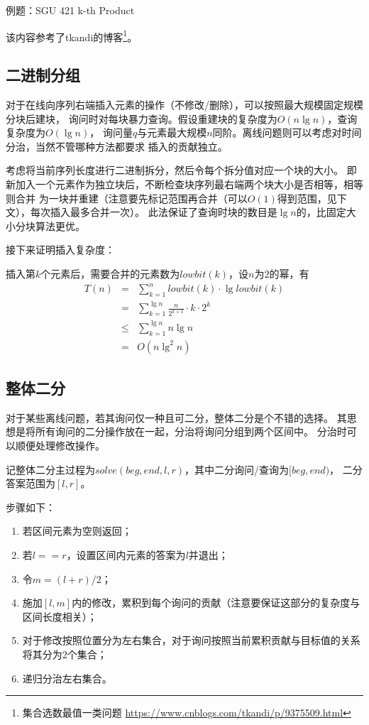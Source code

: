 例题：SGU 421 k-th Product

该内容参考了tkandi的博客\footnote{
	集合选数最值一类问题
	\url{https://www.cnblogs.com/tkandi/p/9375509.html}
}。
\subsection{二进制分组}\label{BinIns}
对于在线向序列右端插入元素的操作（不修改/删除），可以按照最大规模固定规模分块后建块，
询问时对每块暴力查询。假设重建块的复杂度为$O(n\lg n)$，查询复杂度为$O(\lg n)$，
询问量$q$与元素最大规模$n$同阶。离线问题则可以考虑对时间分治，当然不管哪种方法都要求
插入的贡献独立。

考虑将当前序列长度进行二进制拆分，然后令每个拆分值对应一个块的大小。
即新加入一个元素作为独立块后，不断检查块序列最右端两个块大小是否相等，相等则合并
为一块并重建（注意要先标记范围再合并（可以$O(1)$得到范围，见下文），每次插入最多合并一次）。
此法保证了查询时块的数目是$\lg n$的，比固定大小分块算法更优。

接下来证明插入复杂度：

插入第$k$个元素后，需要合并的元素数为$lowbit(k)$，设$n$为$2$的幂，有
\begin{eqnarray*}
	T(n)&=&\sum_{k=1}^n {lowbit(k)\cdot \lg lowbit(k)}\\
	&=&\sum_{k=1}^{\lg n} {\frac{n}{2^{k+1}}\cdot k\cdot 2^k}\\
	&\leq&\sum_{k=1}^{\lg n} {n \lg n}\\
	&=&O(n\lg^2 n)
\end{eqnarray*}
\subsection{整体二分}
对于某些离线问题，若其询问仅一种且可二分，整体二分是个不错的选择。
其思想是将所有询问的二分操作放在一起，分治将询问分组到两个区间中。
分治时可以顺便处理修改操作。

记整体二分主过程为$solve(beg,end,l,r)$，其中二分询问/查询为$[beg,end)$，
二分答案范围为$[l,r]$。

步骤如下：
\begin{enumerate}
	\item 若区间元素为空则返回；
	\item 若$l==r$，设置区间内元素的答案为$l$并退出；
	\item 令$m=(l+r)/2$；
	\item 施加$[l,m]$内的修改，累积到每个询问的贡献（注意要保证这部分的复杂度与
	      区间长度相关）；
	\item 对于修改按照位置分为左右集合，对于询问按照当前累积贡献与目标值的关系
	      将其分为2个集合；
	\item 递归分治左右集合。
\end{enumerate}
